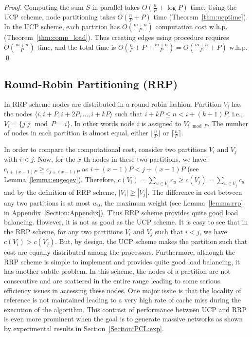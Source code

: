 \documentclass[conference,letterpaper,10pt]{IEEEtran}
\begin{document}
\begin{proof}
Computing the sum $S$  in parallel takes $O\left(\frac{n}{P}+\log{P}\right)$  time. Using the UCP  scheme, node partitioning takes $O\left(\frac{n}{P} + P\right)$ time (Theorem~\ref{thm:ucptime}). In the UCP  scheme, each partition has $O\left(\frac{m+n}{P}\right)$  computation cost w.h.p. (Theorem~\ref{thm:comp_load}). Thus creating edges using procedure  requires $O\left(\frac{m+n}{P}\right)$  time, and the total time is $O\left(\frac{n}{P} + P + \frac{m+n}{P} \right)=O\left(\frac{m+n}{P} +P\right)$ w.h.p.
\qed
\end{proof}

\subsection{Round-Robin Partitioning (RRP)}
\label{Section:PCL:RRP}
In RRP scheme nodes are distributed in a round robin fashion.  Partition $V_i$ has the nodes $\langle i,i+P,i+2P,\ldots,i+kP \rangle $ such that $i + kP \leq n < i + (k+1)P$; i.e., $V_i=\{j|j \mod P =i\}$. In other words node $i$ is assigned to $V_{i \mod P}$. The number of nodes in each partition is almost equal, either $\lfloor \frac{n}{P} \rfloor$ or $\lceil \frac{n}{P} \rceil$. 

In order to compare the computational cost, consider two partitions $V_{i}$ and $V_{j}$ with $i < j$. Now, for the $x$-th nodes in these two partitions,  we have:  $c_{i+(x-1)P} \geq c_{j+(x-1)P}$  as $i+(x-1)P< j+(x-1)P$ (see Lemma~\ref{lemma:eugeqev}). Therefore, $c(V_{i})=\sum_{u\in V_{i}}c_{u} \geq c(V_{j})=\sum_{u\in V_{j}}c_{u}$ and by the definition of RRP scheme, $|V_{i}| \geq |V_{j}|.$ The difference in cost between any two partitions is at most $w_0$, the maximum weight (see Lemma~\ref{lemma:rrp} in Appendix~\ref{Section:Appendix}). Thus RRP scheme provides quite good load balancing. However, it is not as good as the UCP scheme. It is easy to see that in the RRP scheme, for any two partitions $V_{i}$ and $V_{j}$ such that $i<j$, we have $c(V_{i}) > c(V_{j})$. But, by design, the UCP scheme makes the partition such that cost are equally distributed among the processors. 
Furthermore, although the RRP scheme is simple to implement and provides quite good load balancing, it has another subtle problem. In this scheme, the nodes of a partition are not consecutive and are scattered in the entire range leading to some serious efficiency issues in accessing these nodes. One major issue is that the locality of reference is not maintained leading to a very high rate of cache miss during the execution of the algorithm. This contrast of performance between UCP and RRP is even more prominent when the goal is to generate massive networks as shown by experimental results in Section~\ref{Section:PCL:exp}.
\end{document}

